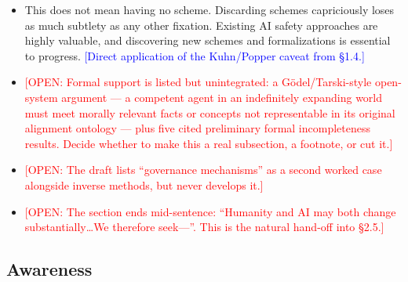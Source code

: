 \documentclass[11pt]{article}
\newcommand{\open}[1]{{\footnotesize\textcolor{red}{[OPEN: #1]}}}
\newcommand{\note}[1]{{\footnotesize\textcolor{blue}{[#1]}}}
\begin{document}
\begin{itemize}
  \item This does not mean having no scheme. Discarding schemes capriciously loses as much subtlety as any other fixation. Existing AI safety approaches are highly valuable, and discovering new schemes and formalizations is essential to progress. \note{Direct application of the Kuhn/Popper caveat from \S1.4.}
  \item \open{Formal support is listed but unintegrated: a Gödel/Tarski-style open-system argument --- a competent agent in an indefinitely expanding world must meet morally relevant facts or concepts not representable in its original alignment ontology --- plus five cited preliminary formal incompleteness results. Decide whether to make this a real subsection, a footnote, or cut it.}
  \item \open{The draft lists ``governance mechanisms'' as a second worked case alongside inverse methods, but never develops it.}
  \item \open{The section ends mid-sentence: ``Humanity and AI may both change substantially\ldots We therefore seek---''. This is the natural hand-off into \S2.5.}
\end{itemize}

\subsection*{Awareness}
\end{document}
